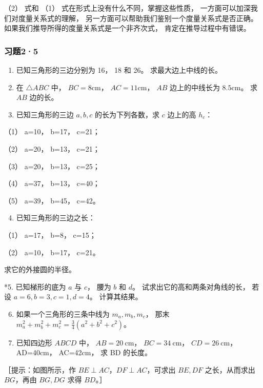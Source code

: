 （2） 式和 （1） 式在形式上没有什么不同，掌握这些性质，
一方面可以加深我们对度量关系式的理解，
另一方面可以帮助我们鉴别一个度量关系式是否正确。如果我们推导所得的度量关系式是一个非齐次式，
肯定在推导过程中有错误。

\subsubsection{习题2·5}

\begin{enumerate}
\item
  已知三角形的三边分别为 16， 18 和 26。 求最大边上中线的长。
\item
  在 \(\triangle ABC\) 中， \(BC = 8\mathrm{cm}\)，
  \(AC = 11\mathrm{cm}\)， \(AB\) 边上的中线长为 \(8.5\mathrm{cm}\)。 求
  \(AB\) 边的长。
\item
  已知三角形的三边 \(a, b, c\) 的长为下列各数，求 \(c\) 边上的高
  \(h_c\)：
\end{enumerate}

（1） a=10， b=17， c=21；

（2） a=20， b=13， c=21；

（3） a=20， b=13， c=25；

（4） a=37， b=13， c=40；

（5） a=39， b=45， c=42。

\begin{enumerate}
\setcounter{enumi}{3}
\item
  已知三角形的三边之长：
\end{enumerate}

（1） a=17， b=8， c=15；

（2） a=10， b=17， c=21。

求它的外接圆的半径。

*5. 已知梯形的底为 \(a\) 与 \(c\)， 腰为 \(b\) 和 \(d\)。
试求出它的高和两条对角线的长， 若设 \(a = 6, b = 3, c = 1, d = 4\)。
计算其结果。

\begin{enumerate}
\setcounter{enumi}{5}
\item
  如果一个三角形的三条中线为 \(m_{a}, m_{b}, m_{c}\)， 那末
  \(m_{a}^{2} + m_{b}^{2} + m_{c}^{2} = \frac{3}{4}(a^{2} + b^{2} + c^{2})\)。
\item
  已知四边形 \(ABCD\) 中， \(AB = 20 \mathrm{~cm}\)，
  \(BC = 34 \mathrm{~cm}\)， \(CD = 26 \mathrm{~cm}\)， AD=40cm，
  AC=42cm， 求 BD 的长度。
\end{enumerate}

［提示：如图所示，作 \(BE \perp AC\)，\(DF \perp AC\)，可求出 \(BE, DF\)
之长，从而求出 \(BG\)，再由 \(BG, DG\) 求得 \(BD\)。］

